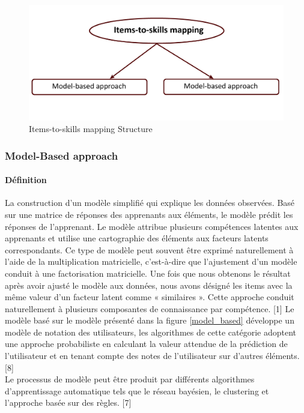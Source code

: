 \begin{figure}[H]
	\begin{center}
		\includegraphics[width=\textwidth]{images/chapitre3/Items_to_skills_mappin_structure.png}
	\end{center}
\caption{Items-to-skills mapping Structure}
\label{items_to_skills_mapping}
\end{figure}

\subsubsection{Model-Based approach}
\paragraph{Définition}
La construction d'un modèle simplifié qui explique les données observées. Basé sur une matrice de réponses des apprenants aux éléments, le modèle prédit les réponses de l'apprenant. Le modèle attribue plusieurs compétences latentes aux apprenants et utilise une cartographie des éléments aux facteurs latents correspondants. Ce type de modèle peut souvent être exprimé naturellement à l'aide de la multiplication matricielle, c'est-à-dire que l'ajustement d'un modèle conduit à une factorisation matricielle. Une fois que nous obtenons le résultat après avoir ajusté le modèle aux données, nous avons désigné les items avec la même valeur d'un facteur latent comme « similaires ». Cette approche conduit naturellement à plusieurs composantes de connaissance par compétence. [1] Le modèle basé sur le modèle présenté dans la figure \ref{model_based} développe un modèle de notation des utilisateurs, les algorithmes de cette catégorie adoptent une approche probabiliste en calculant la valeur attendue de la prédiction de l'utilisateur et en tenant compte des notes de l'utilisateur sur d'autres éléments. [8] \\
Le processus de modèle peut être produit par différents algorithmes d'apprentissage automatique tels que le réseau bayésien, le clustering et l'approche basée sur des règles. [7]

